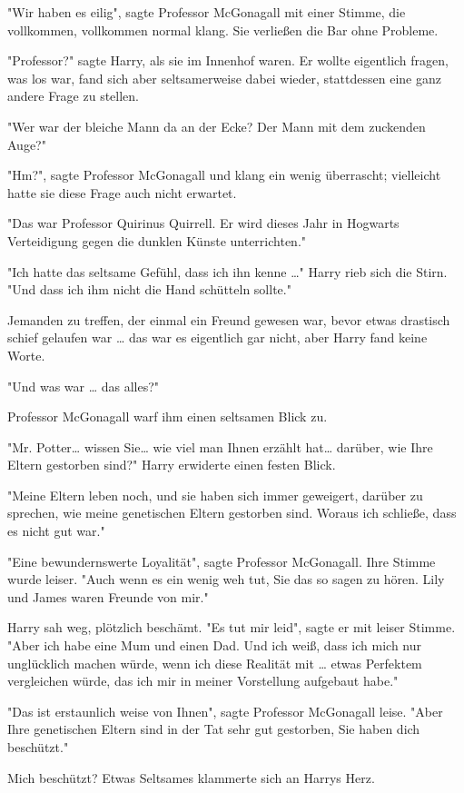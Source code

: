 {"Wir haben es eilig", sagte Professor McGonagall mit einer Stimme, die vollkommen, vollkommen normal klang. Sie verließen die Bar ohne Probleme.

"Professor?" sagte Harry, als sie im Innenhof waren. Er wollte eigentlich fragen, was los war, fand sich aber seltsamerweise dabei wieder, stattdessen eine ganz andere Frage zu stellen.

"Wer war der bleiche Mann da an der Ecke? Der Mann mit dem zuckenden Auge?"

"Hm?", sagte Professor McGonagall und klang ein wenig überrascht; vielleicht hatte sie diese Frage auch nicht erwartet.

"Das war Professor Quirinus Quirrell. Er wird dieses Jahr in Hogwarts Verteidigung gegen die dunklen Künste unterrichten."

"Ich hatte das seltsame Gefühl, dass ich ihn kenne …" Harry rieb sich die Stirn. "Und dass ich ihm nicht die Hand schütteln sollte."

Jemanden zu treffen, der einmal ein Freund gewesen war, bevor etwas drastisch schief gelaufen war … das war es eigentlich gar nicht, aber Harry fand keine Worte.

"Und was war … das alles?"

Professor McGonagall warf ihm einen seltsamen Blick zu.

"Mr. Potter… wissen Sie… wie viel man Ihnen erzählt hat… darüber, wie Ihre Eltern gestorben sind?" Harry erwiderte einen festen Blick.

"Meine Eltern leben noch, und sie haben sich immer geweigert, darüber zu sprechen, wie meine genetischen Eltern gestorben sind. Woraus ich schließe, dass es nicht gut war."

"Eine bewundernswerte Loyalität", sagte Professor McGonagall. Ihre Stimme wurde leiser. "Auch wenn es ein wenig weh tut, Sie das so sagen zu hören. Lily und James waren Freunde von mir."

Harry sah weg, plötzlich beschämt. "Es tut mir leid", sagte er mit leiser Stimme. "Aber ich habe eine Mum und einen Dad. Und ich weiß, dass ich mich nur unglücklich machen würde, wenn ich diese Realität mit … etwas Perfektem vergleichen würde, das ich mir in meiner Vorstellung aufgebaut habe."

"Das ist erstaunlich weise von Ihnen", sagte Professor McGonagall leise. "Aber Ihre genetischen Eltern sind in der Tat sehr gut gestorben, Sie haben dich beschützt."

Mich beschützt? Etwas Seltsames klammerte sich an Harrys Herz.

}
